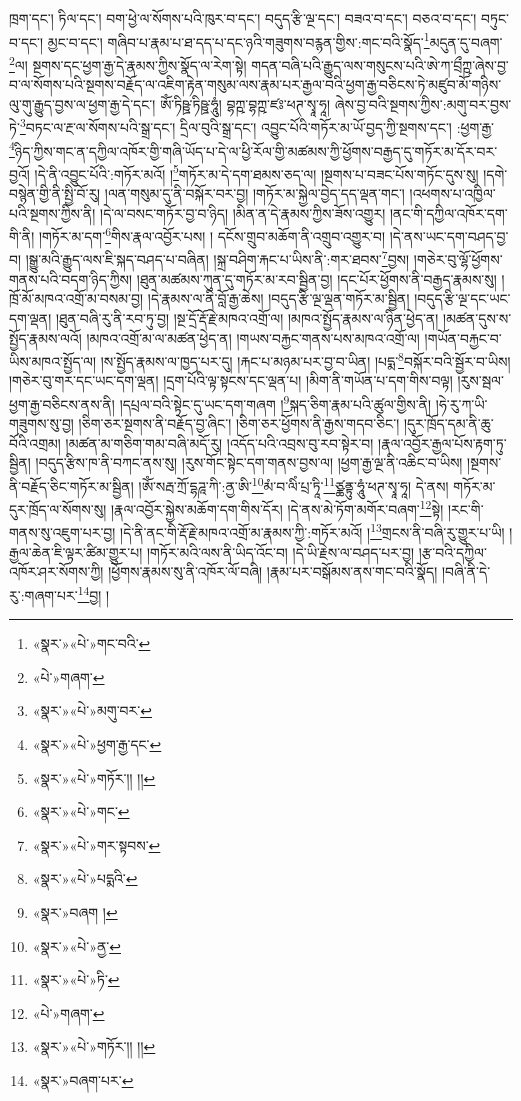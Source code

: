 ཁྲག་དང་། ཏིལ་དང་། བག་ཕྱེ་ལ་སོགས་པའི་ཁུར་བ་དང་། བདུད་རྩི་ལྔ་དང་། བཟའ་བ་དང་། བཅའ་བ་དང་། བཏུང་བ་དང་། མྱང་བ་དང་། གཞིབ་པ་རྣམ་པ་ཐ་དད་པ་དང་ཉའི་གཟུགས་བརྙན་གྱིས་:གང་བའི་སྣོད་\footnote{«སྣར་»«པེ་»གང་བའི་}མདུན་དུ་བཞག་\footnote{«པེ་»གཞག་}ལ། སྔགས་དང་ཕྱག་རྒྱ་དེ་རྣམས་ཀྱིས་སྣོད་ལ་རེག་སྟེ། གདན་བཞི་པའི་རྒྱུད་ལས་གསུངས་པའི་ཨེ་ཀ་བྲྀཀྵ་ཞེས་བྱ་བ་ལ་སོགས་པའི་སྔགས་བརྗོད་ལ་འཇིག་རྟེན་གསུམ་ལས་རྣམ་པར་རྒྱལ་བའི་ཕྱག་རྒྱ་བཅིངས་ཏེ་མཛུབ་མོ་གཉིས་ལུ་གུ་རྒྱུད་བྱས་ལ་ཕྱག་རྒྱ་དེ་དང་། ཨོཾ་ཏིཥྛ་ཏིཥྛ་ཧཱུཾ། བྷཀྵ་བྷཀྵ་ཛཿ་ཕཊ་སྭཱ་ཧཱ། ཞེས་བྱ་བའི་སྔགས་ཀྱིས་:མགུ་བར་བྱས་ཏེ་\footnote{«སྣར་»«པེ་»མགུ་བར་}བཏང་ལ་རྔ་ལ་སོགས་པའི་སྒྲ་དང་། དྲིལ་བུའི་སྒྲ་དང་། འབྱུང་པོའི་གཏོར་མ་ཡོ་བྱད་ཀྱི་སྔགས་དང་། :ཕྱག་རྒྱ་\footnote{«སྣར་»«པེ་»ཕྱག་རྒྱ་དང་}ཉིད་ཀྱིས་གང་ན་དཀྱིལ་འཁོར་གྱི་གཞི་ཡོད་པ་དེ་ལ་ཕྱི་རོལ་གྱི་མཚམས་ཀྱི་ཕྱོགས་བརྒྱད་དུ་གཏོར་མ་དོར་བར་བྱའོ། །དེ་ནི་འབྱུང་པོའི་:གཏོར་མའོ། །\footnote{«སྣར་»«པེ་»གཏོར་།། །།}གཏོར་མ་དེ་དག་ཐམས་ཅད་ལ། །སྔགས་པ་བཟང་པོས་གཏོང་དུས་སུ། །དགེ་བསྙེན་གྱི་ནི་སྤྱི་བོ་རུ། །ལན་གསུམ་དུ་ནི་བསྐོར་བར་བྱ། །གཏོར་མ་སྐྱེལ་བྱེད་དད་ལྡན་གང་། །འཕགས་པ་འཁྱིལ་པའི་སྔགས་ཀྱིས་ནི། །དེ་ལ་བསང་གཏོར་བྱ་བ་ཉིད། །མིན་ན་དེ་རྣམས་ཀྱིས་ཟོས་འགྱུར། །ནང་གི་དཀྱིལ་འཁོར་དག་གི་ནི། །གཏོར་མ་དག་\footnote{«སྣར་»«པེ་»གང་}གིས་རྣལ་འབྱོར་པས། །
དངོས་གྲུབ་མཆོག་ནི་འགྲུབ་འགྱུར་བ། །དེ་ནས་ཡང་དག་བཤད་བྱ་བ། །སྒྱུ་མའི་རྒྱུད་ལས་ཇི་སྐད་བཤད་པ་བཞིན། །སྐྲ་བཤིག་རྐང་པ་ཡིས་ནི་:གར་ཐབས་\footnote{«སྣར་»«པེ་»གར་སྟབས་}བྱས། །གཅེར་བུ་ལྷོ་ཕྱོགས་གནས་པའི་བདག་ཉིད་ཀྱིས། །ཐུན་མཚམས་ཀུན་དུ་གཏོར་མ་རབ་སྦྱིན་བྱ། །དང་པོར་ཕྱོགས་ནི་བརྒྱད་རྣམས་སུ། །ཁྲོ་མོ་མཁའ་འགྲོ་མ་བསམ་བྱ། །དེ་རྣམས་ལ་ནི་བློ་རྒྱ་ཆེས། །བདུད་རྩི་ལྔ་ལྡན་གཏོར་མ་སྦྱིན། །བདུད་རྩི་ལྔ་དང་ཡང་དག་ལྡན། །ཐུན་བཞི་རུ་ནི་རབ་ཏུ་བྱ། །སྔ་དྲོ་རྡོ་རྗེ་མཁའ་འགྲོ་ལ། །མཁའ་སྤྱོད་རྣམས་ལ་ཉིན་ཕྱེད་ན། །མཚན་དུས་ས་སྤྱོད་རྣམས་ལའོ། །མཁའ་འགྲོ་མ་ལ་མཚན་ཕྱེད་ན། །གཡས་བརྐྱང་གནས་པས་མཁའ་འགྲོ་ལ། །གཡོན་བརྐྱང་བ་ཡིས་མཁའ་སྤྱོད་ལ། །ས་སྤྱོད་རྣམས་ལ་ཁྱད་པར་དུ། །རྐང་པ་མཉམ་པར་བྱ་བ་ཡིན། །པདྨ་\footnote{«སྣར་»«པེ་»པདྨའི་}བསྐོར་བའི་སྦྱོར་བ་ཡིས། །གཅེར་བུ་གར་དང་ཡང་དག་ལྡན། །དྲག་པོའི་ལྟ་སྟངས་དང་ལྡན་པ། །མིག་ནི་གཡོན་པ་དག་གིས་བལྟ། །རུས་སྦལ་ཕྱག་རྒྱ་བཅིངས་ནས་ནི། །དཔྲལ་བའི་སྟེང་དུ་ཡང་དག་གཞག །\footnote{«སྣར་»བཞག །}སྐད་ཅིག་རྣམ་པའི་ཚུལ་གྱིས་ནི། །ཧེ་རུ་ཀ་ཡི་གཟུགས་སུ་བྱ། །ཅིག་ཅར་སྔགས་ནི་བརྗོད་བྱ་ཞིང་། །ཅིག་ཅར་ཕྱོགས་ནི་རྒྱས་གདབ་ཅིང་། །དུར་ཁྲོད་དམ་ནི་ཆུ་བོའི་འགྲམ། །མཚན་མ་གཅིག་གམ་བཞི་མདོ་རུ། །འདོད་པའི་འབྲས་བུ་རབ་སྟེར་བ། །རྣལ་འབྱོར་རྒྱལ་པོས་རྟག་ཏུ་སྦྱིན། །བདུད་རྩིས་ཁ་ནི་བཀང་ནས་སུ། །རུས་གོང་སྟེང་དག་གནས་བྱས་ལ། །ཕྱག་རྒྱ་ལྔ་ནི་འཆིང་བ་ཡིས། །སྔགས་ནི་བརྗོད་ཅིང་གཏོར་མ་སྦྱིན། །ཨོཾ་སརྦ་ཀྲོ་དྷཌཱ་ཀི་:ནྱ་ཨི་\footnote{«སྣར་»«པེ་»ནྱ་}མཾ་བ་ལིཾ་པྲ་ཏཱི་\footnote{«སྣར་»«པེ་»ཏི་}ཙྪནྟུ་ཧཱུཾ་ཕཊ་སྭཱ་ཧཱ། དེ་ནས། གཏོར་མ་དུར་ཁྲོད་ལ་སོགས་སུ། །རྣལ་འབྱོར་སྐྱེས་མཆོག་དག་གིས་དོར། །དེ་ནས་མེ་ཏོག་མགོར་བཞག་\footnote{«པེ་»གཞག་}སྟེ། །རང་གི་གནས་སུ་འཇུག་པར་བྱ། །དེ་ནི་ནང་གི་རྡོ་རྗེ་མཁའ་འགྲོ་མ་རྣམས་ཀྱི་:གཏོར་མའོ། །\footnote{«སྣར་»«པེ་»གཏོར་།། །།}གྲངས་ནི་བཞི་རུ་གྱུར་པ་ཡི། །རྒྱལ་ཆེན་ཇི་ལྟར་ཚིམ་གྱུར་པ། །གཏོར་མའི་ལས་ནི་ཡིད་འོང་བ། །དེ་ཡི་རྗེས་ལ་བཤད་པར་བྱ། །རྩ་བའི་དཀྱིལ་འཁོར་ཤར་སོགས་ཀྱི། །ཕྱོགས་རྣམས་སུ་ནི་འཁོར་ལོ་བཞི། །རྣམ་པར་བསྒོམས་ནས་གང་བའི་སྣོད། །བཞི་ནི་དེ་རུ་:གཞག་པར་\footnote{«སྣར་»བཞག་པར་}བྱ། །
